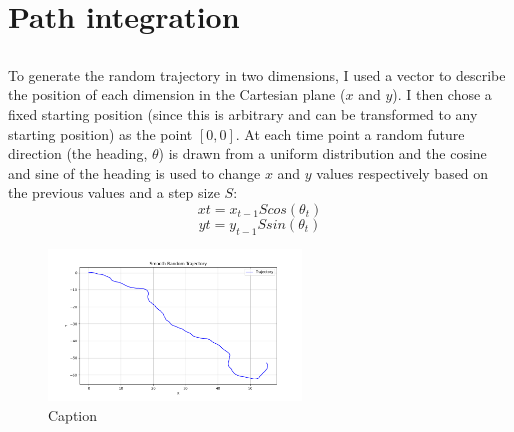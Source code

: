 \documentclass{article}
\begin{document}
\section{Path integration}
\subsection{}
To generate the random trajectory in two dimensions, I used a vector to describe the position of each dimension in the Cartesian plane ($x$ and $y$). I then chose a fixed starting position (since this is arbitrary and can be transformed to any starting position) as the point $[0,0]$.
At each time point a random future direction (the heading, $\theta$) is drawn from a uniform distribution and the cosine and sine of the heading is used to change $x$ and $y$ values respectively based on the previous values and a step size $S$: 
\begin{equation*}
    x{t} = x_{t - 1} S cos(\theta_{t})
\end{equation*}
\begin{equation}
    y{t} = y_{t - 1} S sin(\theta_{t})
\end{equation}

\begin{figure}
    \centering
    \includegraphics[width=0.6\textwidth]{konsta_31.png}
    \caption{Caption}
    \label{fig:enter-label}
\end{figure}
\end{document}
